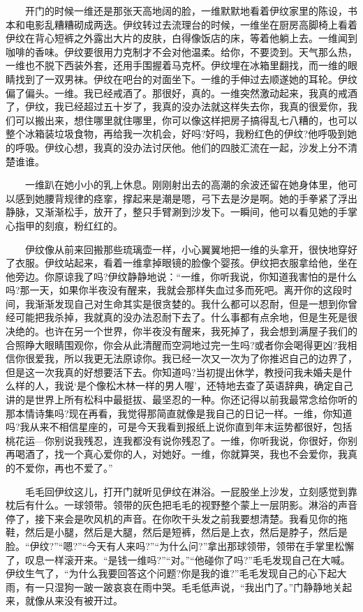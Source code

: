 \documentclass[12pt,UTF8]{ctexbook}
\begin{document}
　　开门的时候一维还是那张天高地阔的脸，一维默默地看着伊纹家里的陈设，书本和电影乱糟糟砌成两迭。伊纹转过去流理台的时候，一维坐在厨房高脚椅上看着伊纹在背心短裤之外露出大片的皮肤，白得像饭店的床，等着他躺上去。一维闻到咖啡的香味。伊纹要很用力克制才不会对他温柔。给你，不要烫到。天气那么热，一维也不脱下西装外套，还用手围握着马克杯。伊纹埋在冰箱里翻找，而一维的眼睛找到了一双男袜。伊纹在吧台的对面坐下。一维的手伸过去顺遂她的耳轮。伊纹偏了偏头。一维。我已经戒酒了。那很好，真的。一维突然激动起来，我真的戒酒了，伊纹，我已经超过五十岁了，我真的没办法就这样失去你，我真的很爱你，我们可以搬出来，想住哪里就住哪里，你可以像这样把房子搞得乱七八糟的，也可以整个冰箱装垃圾食物，再给我一次机会，好吗?好吗，我粉红色的伊纹?他呼吸到她的呼吸。伊纹心想，我真的没办法讨厌他。他们的四肢汇流在一起，沙发上分不清楚谁谁。

　　一维趴在她小小的乳上休息。刚刚射出去的高潮的余波还留在她身体里，他可以感到她腰背规律的痉挛，撑起来是潮是嗯，弓下去是汐是啊。她的手拳紧了浮出静脉，又渐渐松手，放开了，整只手臂涮到沙发下。一瞬间，他可以看见她的手掌心指甲的刻痕，粉红红的。

　　伊纹像从前来回搬那些琉璃壶一样，小心翼翼地把一维的头拿开，很快地穿好了衣服。伊纹站起来，看着一维拿掉眼镜的脸像个婴孩。伊纹把衣服拿给他，坐在他旁边。你原谅我了吗?伊纹静静地说：\enquote{一维，你听我说，你知道我害怕的是什么吗?那一天，如果你半夜没有醒来，我就会那样失血过多而死吧。离开你的这段时间，我渐渐发现自己对生命其实是很贪婪的。我什么都可以忍耐，但是一想到你曾经可能把我杀掉，我就真的没办法忍耐下去了。什么事都有点余地，但是生死是很决绝的。也许在另一个世界，你半夜没有醒来，我死掉了，我会想到满屋子我们的合照睁大眼睛围观你，你会从此清醒而空洞地过完一生吗?或者你会喝得更凶?我相信你很爱我，所以我更无法原谅你。我已经一次又一次为了你推迟自己的边界了，但是这一次我真的好想要活下去。你知道吗?当初提出休学，教授问我未婚夫是什么样的人，我说`是个像松木林一样的男人喔'，还特地去查了英语辞典，确定自己讲的是世界上所有松科中最挺拔、最坚忍的一种。你还记得以前我最常念给你听的那本情诗集吗?现在再看，我觉得那简直就像是我自己的日记一样。一维，你知道吗?我从来不相信星座的，可是今天我看到报纸上说你直到年末运势都很好，包括桃花运---你别说我残忍，连我都没有说你残忍了。一维，你听我说，你很好，你别再喝酒了，找一个真心爱你的人，对她好。一维，你就算哭，我也不会爱你，我真的不爱你，再也不爱了。}

　　毛毛回伊纹这儿，打开门就听见伊纹在淋浴。一屁股坐上沙发，立刻感觉到靠枕后有什么。一球领带。领带的灰色把毛毛的视野整个蒙上一层阴影。淋浴的声音停了，接下来会是吹风机的声音。在你吹干头发之前我要想清楚。我看见你的拖鞋，然后是小腿，然后是大腿，然后是短裤，然后是上衣，然后是脖子，然后是脸。\enquote{伊纹?}\enquote{嗯?}\enquote{今天有人来吗?}\enquote{为什么问?}拿出那球领带，领带在手掌里松懈了，叹息一样滚开来。\enquote{是钱一维吗?}\enquote{对。}\enquote{他碰你了吗?}毛毛发现自己在大喊。伊纹生气了，\enquote{为什么我要回答这个问题?你是我的谁?}毛毛发现自己的心下起大雨，有一只湿狗一跛一跛哀哀在雨中哭。毛毛低声说，\enquote{我出门了。}门静静地关起来，就像从来没有被开过。
\end{document}
